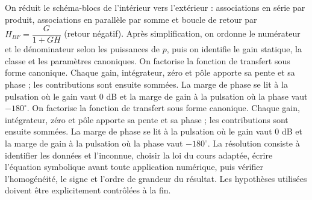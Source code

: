 \begin{corrigebox}[Corrigé]
On réduit le schéma-blocs de l'intérieur vers l'extérieur : associations en série par produit, associations en parallèle par somme et boucle de retour par $H_{BF}=\dfrac{G}{1+GH}$ (retour négatif). Après simplification, on ordonne le numérateur et le dénominateur selon les puissances de $p$, puis on identifie le gain statique, la classe et les paramètres canoniques.
On factorise la fonction de transfert sous forme canonique. Chaque gain, intégrateur, zéro et pôle apporte sa pente et sa phase ; les contributions sont ensuite sommées. La marge de phase se lit à la pulsation où le gain vaut $0$ dB et la marge de gain à la pulsation où la phase vaut $-180^\circ$.
On factorise la fonction de transfert sous forme canonique. Chaque gain, intégrateur, zéro et pôle apporte sa pente et sa phase ; les contributions sont ensuite sommées. La marge de phase se lit à la pulsation où le gain vaut $0$ dB et la marge de gain à la pulsation où la phase vaut $-180^\circ$.
La résolution consiste à identifier les données et l'inconnue, choisir la loi du cours adaptée, écrire l'équation symbolique avant toute application numérique, puis vérifier l'homogénéité, le signe et l'ordre de grandeur du résultat. Les hypothèses utilisées doivent être explicitement contrôlées à la fin.
\end{corrigebox}

